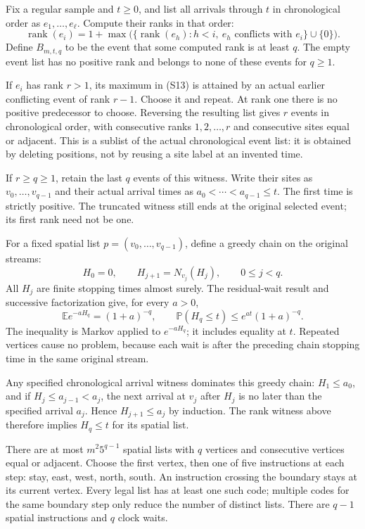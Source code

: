 \documentclass[
  11pt,
  a4paper,
]{article}
\begin{document}
Fix a regular sample and \(t\geq0\), and list all arrivals through \(t\)
in chronological order as \(e_1,\ldots,e_\ell\). Compute their ranks in
that order: \[
\operatorname{rank}(e_i)=1+\max\bigl(\{\operatorname{rank}(e_h):h<i,
\ e_h\text{ conflicts with }e_i\}\cup\{0\}\bigr).
\tag{S13}
\] Define \(B_{m,t,q}\) to be the event that some computed rank is at
least \(q\). The empty event list has no positive rank and belongs to
none of these events for \(q\geq1\).

If \(e_i\) has rank \(r>1\), its maximum in (S13) is attained by an
actual earlier conflicting event of rank \(r-1\). Choose it and repeat.
At rank one there is no positive predecessor to choose. Reversing the
resulting list gives \(r\) events in chronological order, with
consecutive ranks \(1,2,\ldots,r\) and consecutive sites equal or
adjacent. This is a sublist of the actual chronological event list: it
is obtained by deleting positions, not by reusing a site label at an
invented time.

If \(r\geq q\geq1\), retain the last \(q\) events of this witness. Write
their sites as \(v_0,\ldots,v_{q-1}\) and their actual arrival times as
\(a_0<\cdots<a_{q-1}\leq t\). The first time is strictly positive. The
truncated witness still ends at the original selected event; its first
rank need not be one.

For a fixed spatial list \(p=(v_0,\ldots,v_{q-1})\), define a greedy
chain on the original streams: \[
H_0=0,\qquad H_{j+1}=N_{v_j}(H_j),\qquad0\leq j<q.
\tag{S14}
\] All \(H_j\) are finite stopping times almost surely. The
residual-wait result and successive factorization give, for every
\(a>0\), \[
\mathbb E e^{-aH_q}=(1+a)^{-q},\qquad
\mathbb P(H_q\leq t)\leq e^{at}(1+a)^{-q}.
\tag{S15}
\] The inequality is Markov applied to \(e^{-aH_q}\); it includes
equality at \(t\). Repeated vertices cause no problem, because each wait
is after the preceding chain stopping time in the same original stream.

Any specified chronological arrival witness dominates this greedy chain:
\(H_1\leq a_0\), and if \(H_j\leq a_{j-1}<a_j\), the next arrival at
\(v_j\) after \(H_j\) is no later than the specified arrival \(a_j\).
Hence \(H_{j+1}\leq a_j\) by induction. The rank witness above therefore
implies \(H_q\leq t\) for its spatial list.

There are at most \(m^2 5^{q-1}\) spatial lists with \(q\) vertices and
consecutive vertices equal or adjacent. Choose the first vertex, then
one of five instructions at each step: stay, east, west, north, south.
An instruction crossing the boundary stays at its current vertex. Every
legal list has at least one such code; multiple codes for the same
boundary step only reduce the number of distinct lists. There are
\(q-1\) spatial instructions and \(q\) clock waits.
\end{document}

